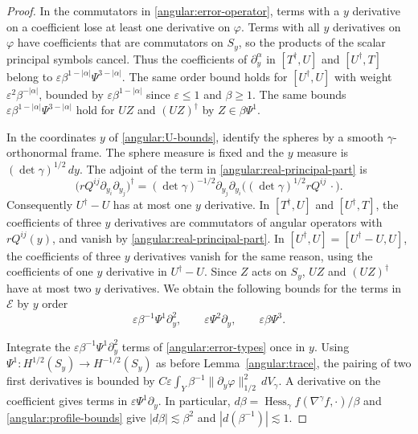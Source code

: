 \documentclass[11pt,a4paper]{article}
\theoremstyle{definition}
\theoremstyle{remark}
\newcommand{\eps}{\varepsilon}
\numberwithin{equation}{section}
\begin{document}
\begin{proof}
In the commutators in \eqref{angular:error-operator}, terms with a
$y$ derivative on a coefficient lose at least one derivative on $\varphi$.
Terms with all $y$ derivatives on $\varphi$ have coefficients that
are commutators on $S_y$, so the products of the scalar principal
symbols cancel. Thus the coefficients of $\partial_y^\alpha$ in
$[T^\dagger,U]$ and $[U^\dagger,T]$ belong to
$\eps\beta^{1-|\alpha|}\Psi^{3-|\alpha|}$. The same order bound
holds for $[U^\dagger,U]$ with weight $\eps^2\beta^{-|\alpha|}$,
bounded by $\eps\beta^{1-|\alpha|}$ since $\eps\le1$ and $\beta\ge1$.
The same bounds $\eps\beta^{1-|\alpha|}\Psi^{3-|\alpha|}$ hold
for $UZ$ and $(UZ)^\dagger$ by $Z\in\beta\Psi^1$.

In the coordinates $y$ of \eqref{angular:U-bounds}, identify the
spheres by a smooth $\gamma$-orthonormal frame. The sphere measure
is fixed and the $y$ measure is $(\det\gamma)^{1/2}\,dy$.
The adjoint of the term in \eqref{angular:real-principal-part} is
\[
 \bigl(rQ^{ij}\partial_{y_i}\partial_{y_j}\bigr)^\dagger
 =(\det\gamma)^{-1/2}\partial_{y_j}\partial_{y_i}
       \bigl((\det\gamma)^{1/2}rQ^{ij}\,\cdot\bigr).
\]
Consequently $U^\dagger-U$ has at most one $y$ derivative.
In $[T^\dagger,U]$ and $[U^\dagger,T]$, the coefficients of
three $y$ derivatives are commutators of angular operators with
$rQ^{ij}(y)$, and vanish by \eqref{angular:real-principal-part}.
In $[U^\dagger,U]=[U^\dagger-U,U]$, the coefficients of three
$y$ derivatives vanish for the same reason, using the coefficients
of one $y$ derivative in $U^\dagger-U$. Since $Z$ acts on $S_y$,
$UZ$ and $(UZ)^\dagger$ have at most two $y$ derivatives. We obtain
the following bounds for the terms in $\mathcal E$ by $y$ order
\begin{equation}\label{angular:error-types}
 \eps\beta^{-1}\Psi^1\partial_y^2,
 \qquad \eps\Psi^2\partial_y,
 \qquad \eps\beta\Psi^3.
\end{equation}

Integrate the $\eps\beta^{-1}\Psi^1\partial_y^2$ terms of
\eqref{angular:error-types} once in $y$. Using
$\Psi^1:H^{1/2}(S_y)\to H^{-1/2}(S_y)$ as before
Lemma~\ref{angular:trace}, the pairing of two first derivatives
is bounded by
$C\eps\int_Y\beta^{-1}\|\partial_y\varphi\|_{1/2}^2\,dV_\gamma$.
A derivative on the coefficient gives terms in
$\eps\Psi^1\partial_y$. In particular,
$d\beta=\operatorname{Hess}_\gamma f(\nabla^\gamma f,\cdot)/\beta$
and \eqref{angular:profile-bounds} give
$|d\beta|\lesssim\beta^2$ and $|d(\beta^{-1})|\lesssim1$.


\end{proof}
\end{document}
